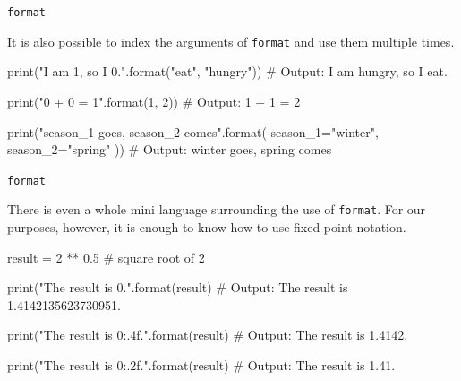\begin{frame}[fragile]{\texttt{format}}

    It is also possible to index the arguments of \texttt{format} and use them multiple times.

    \begin{pythoncode}

print("I am {1}, so I {0}.".format("eat", "hungry"))
# Output: I am hungry, so I eat.

print("{0} + {0} = {1}".format(1, 2))
# Output: 1 + 1 = 2

print("{season_1} goes, {season_2} comes".format(
    season_1="winter", 
    season_2="spring"
))
# Output: winter goes, spring comes

    \end{pythoncode}



\end{frame}


\begin{frame}[fragile]{\texttt{format}}

    There is even a whole mini language surrounding the use of \texttt{format}. For our purposes, however, it is enough to know how to use fixed-point notation.

    \begin{pythoncode}
result = 2 ** 0.5 # square root of 2

print("The result is {0}.".format(result)
# Output: The result is 1.4142135623730951.

print("The result is {0:.4f}.".format(result)
# Output: The result is 1.4142.

print("The result is {0:.2f}.".format(result)
# Output: The result is 1.41.
    \end{pythoncode}


\end{frame}

